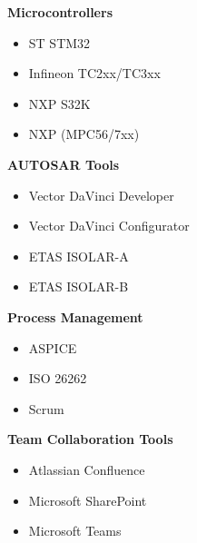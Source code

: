\hfill
\begin{minipage}[t]{0.48\textwidth}
\textbf{Microcontrollers}
\begin{itemize}[leftmargin=*,noitemsep,topsep=0pt]
    \item ST STM32 
    \item Infineon TC2xx/TC3xx 
    \item NXP S32K 
    \item NXP (MPC56/7xx) 
\end{itemize}

\vspace{0.5em}

\textbf{AUTOSAR Tools}
\begin{itemize}[leftmargin=*,noitemsep,topsep=0pt]
    \item Vector DaVinci Developer 
    \item Vector DaVinci Configurator 
    \item ETAS ISOLAR-A 
    \item ETAS ISOLAR-B 
\end{itemize}

\vspace{0.5em}

\textbf{Process Management}
\begin{itemize}[leftmargin=*,noitemsep,topsep=0pt]
    \item ASPICE 
    \item ISO 26262 
    \item Scrum 
\end{itemize}

\vspace{0.5em}

\textbf{Team Collaboration Tools}
\begin{itemize}[leftmargin=*,noitemsep,topsep=0pt]
    \item Atlassian Confluence 
    \item Microsoft SharePoint 
    \item Microsoft Teams 
\end{itemize}

\vspace{0.5em}


\end{minipage}
